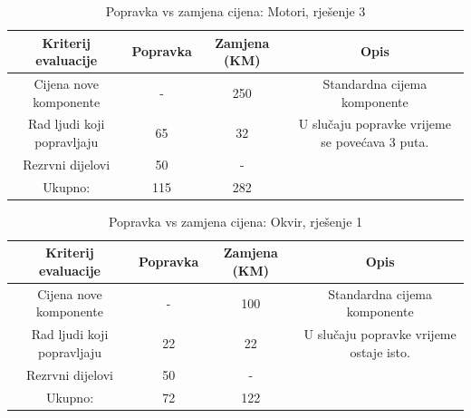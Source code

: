\documentclass[12pt]{article}
\begin{document}
\begin{landscape}
\vspace*{\fill}
\begin{table}[htbp]
\footnotesize
  \centering
  \caption{Popravka vs zamjena cijena: Motori, rješenje 3}
    \begin{tabular}{cccc}
    \toprule
    Kriterij evaluacije & Popravka & Zamjena (KM) & Opis \\
    \midrule
     Cijena nove komponente & -     & 250   & \multicolumn{1}{p{24.285em}}{Standardna \newline{}cijema\newline{} komponente} \\
    \midrule
    Rad ljudi koji popravljaju & 65    & 32    & \multicolumn{1}{p{24.285em}}{ U slučaju popravke vrijeme se povećava 3 puta. } \\
    \midrule
    Rezrvni dijelovi & 50    & -     &  \\
    \midrule
    Ukupno: & 115   & 282   &  \\
    \bottomrule
    \end{tabular}%
  \label{tab:addlabel}%
\end{table}%

\begin{table}[htbp]
  \centering
  \footnotesize
  \caption{Popravka vs zamjena cijena: Okvir, rješenje 1}
    \begin{tabular}{cccc}
    \toprule
    Kriterij evaluacije & Popravka & Zamjena (KM) & Opis \\
    \midrule
     Cijena nove komponente & -     & 100   & \multicolumn{1}{p{19.57em}}{Standardna \newline{}cijema\newline{} komponente} \\
    \midrule
    Rad ljudi koji popravljaju & 22    & 22    & \multicolumn{1}{p{19.57em}}{ U slučaju popravke vrijeme ostaje isto. } \\
    \midrule
    Rezrvni dijelovi & 50    & -     &  \\
    \midrule
    Ukupno: & 72    & 122   &  \\
    \bottomrule
    \end{tabular}%
  \label{tab:addlabel}%
\end{table}%
\vspace*{\fill}
\end{landscape}
\end{document}
